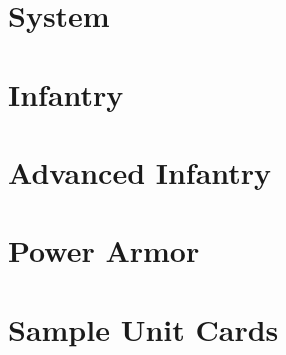 \documentclass{article}
\begin{document}
\newpage

\section{System}



\newpage

\section{Infantry}



\newpage

\section{Advanced Infantry}



\newpage

\section{Power Armor}



\newpage

\section{Sample Unit Cards}



\newpage
\end{document}
